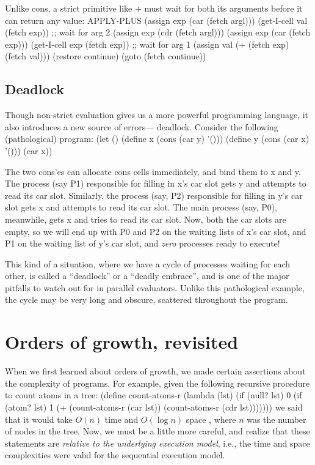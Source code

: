 Unlike {\cf cons}, a strict primitive like {\cf +} must wait for both its
arguments before it can return any value:
\beginlisp
APPLY-PLUS
  (assign exp (car (fetch argl)))
  (get-I-cell val (fetch exp))        ;; wait for arg 2
  (assign exp (cdr (fetch argl)))
  (assign exp (car (fetch exp)))
  (get-I-cell exp (fetch exp))        ;; wait for arg 1
\null
  (assign val (+ (fetch exp) (fetch val)))
  (restore continue)
  (goto (fetch continue))
\endlisp

\subsection{Deadlock}

Though non-strict evaluation gives us a more powerful programming language,
it also introduces a new source of errors--- deadlock.  Consider the following
(pathological) program:
\beginlisp
(let ()
  (define x (cons (car y) '()))
  (define y (cons (car x) '()))
  (car x))
\endlisp

 The two {\cf cons}'es can allocate cons cells immediately, and bind
them to {\cf x} and {\cf y}.  The process (say P1) responsible for
filling in {\cf x}'s car slot gets {\cf y} and attempts to read its
car slot.  Similarly, the process (say, P2) responsible for filling in
{\cf y}'s car slot gets {\cf x} and attempts to read its car slot.
The main process (say, P0), meanwhile, gets {\cf x} and tries to read
its car slot.  Now, both the car slots are empty, so we will end up
with {\cf P0} and {\cf P2} on the waiting lists of {\cf x}'s car slot,
and {\cf P1} on the waiting list of {\cf y}'s car slot, and {\em
zero\/} processes ready to execute!

This kind of a situation, where we have a cycle of processes waiting
for each other, is called a ``deadlock'' or a ``deadly embrace'', and
is one of the major pitfalls to watch out for in parallel evaluators.
Unlike this pathological example, the cycle may be very long and
obscure, scattered throughout the program.


\section{Orders of growth, revisited}

When we first learned about orders of growth,  we made certain assertions
about the complexity of programs. For example, given the following recursive
procedure to count atoms in a tree:
\beginlisp
(define count-atoms-r (lambda (lst)
    (if (null? lst)
        0
        (if (atom? lst)
            1
            (+ (count-atoms-r (car lst))
               (count-atoms-r (cdr lst)))))))
\endlisp
 we said that it would take $O(n)$ time and $O(\log n)$ space , where $n$ was
the number of nodes in the tree.   Now, we must be a little more careful, and
realize that these statements are {\em relative to the underlying execution
model\/}, i.e., the time and space complexities were valid for the sequential
execution model.


